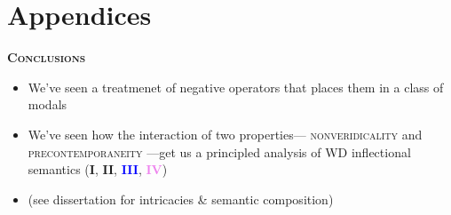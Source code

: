 \documentclass[dvipsnames]{beamer}%
\newcommand{\I}{\textbf{\textcolor{forest}{I}}}
\newcommand{\II}{\textbf{\textcolor{ochre}{II}}}
\newcommand{\III}{\textbf{\textcolor{blue}{III}}}
\newcommand{\IV}{\textbf{\textcolor{violet}{IV}}}
\begin{document}
\section*{Appendices}
\begin{frame}{\textbf{\textsc{Conclusions}}}
	\begin{itemize}
		\item<+-> We've seen a treatmenet of negative operators that places them in a class of modals
		\item<+-> We've seen how the interaction of two properties--- \textsc{nonveridicality} and \textsc{precontemporaneity }---get us a principled analysis of WD inflectional semantics (\I, \II, \III, \IV)
		\item<+-> {\small (see dissertation for intricacies \& semantic composition)}
	\end{itemize}
\end{frame}



\end{document}
